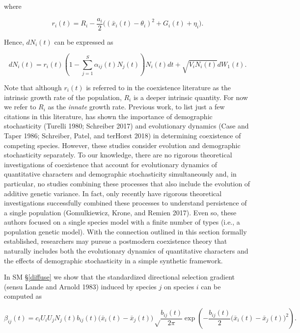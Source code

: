 \documentclass[]{article}
\begin{document}
where

\begin{equation}
r_i(t)=R_i-\frac{a_i}{2}\Big((\bar x_i(t)-\theta_i)^2+G_i(t)+\eta_i\Big).
\end{equation}

Hence, \(dN_i(t)\) can be expressed as

\begin{equation}
dN_i(t)=r_i(t)\left(1-\sum_{j=1}^S\alpha_{ij}(t)N_j(t)\right)N_i(t)dt+\sqrt{V_iN_i(t)}dW_1(t).
\end{equation}

Note that although \(r_i(t)\) is referred to in the coexistence
literature as the intrinsic growth rate of the population, \(R_i\) is a
deeper intrinsic quantity. For now we refer to \(R_i\) as the
\emph{innate} growth rate. Previous work, to list just a few citations
in this literature, has shown the importance of demographic
stochasticity (Turelli 1980; Schreiber 2017) and evolutionary dynamics
(Case and Taper 1986; Schreiber, Patel, and terHorst 2018) in
determining coexistence of competing species. However, these studies
consider evolution and demographic stochasticity separately. To our
knowledge, there are no rigorous theoretical investigations of
coexistence that account for evolutionary dynamics of quantitative
characters and demographic stochasticity simultaneously and, in
particular, no studies combining these processes that also include the
evolution of additive genetic variance. In fact, only recently have
rigorous theoretical investigations successfully combined these
processes to understand persistence of a single population
(Gomulkiewicz, Krone, and Remien 2017). Even so, these authors focused
on a single species model with a finite number of types (i.e., a
population genetic model). With the connection outlined in this section
formally established, researchers may pursue a postmodern coexistence
theory that naturally includes both the evolutionary dynamics of
quantitative characters and the effects of demographic stochasticity in
a simple synthetic framework.

In SM \S\ref{diffuse} we show that the standardized directional
selection gradient (sensu Lande and Arnold 1983) induced by species
\(j\) on species \(i\) can be computed as

\begin{equation}
\beta_{ij}(t)=c_iU_iU_jN_j(t)b_{ij}(t)\big(\bar x_i(t)-\bar x_j(t)\big) \sqrt\frac{b_{ij}(t)}{2\pi}\exp\left(-\frac{b_{ij}(t)}{2}\big(\bar x_i(t)-\bar x_j(t)\big)^2\right).
\end{equation}
\end{document}
